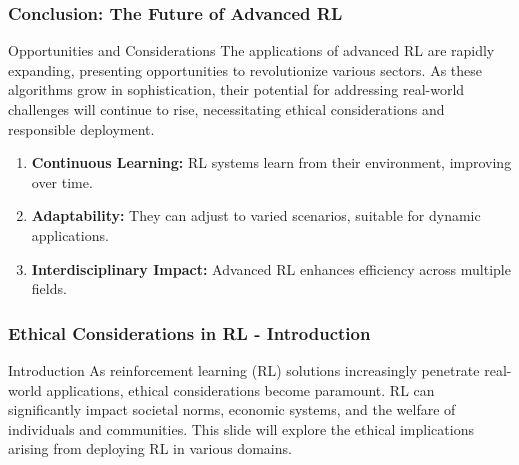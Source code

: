 \documentclass{beamer}
\begin{document}
\begin{frame}[fragile]
    \frametitle{Conclusion: The Future of Advanced RL}
    \begin{block}{Opportunities and Considerations}
        The applications of advanced RL are rapidly expanding, presenting opportunities to revolutionize various sectors. As these algorithms grow in sophistication, their potential for addressing real-world challenges will continue to rise, necessitating ethical considerations and responsible deployment.
    \end{block}

    \begin{enumerate}
        \item \textbf{Continuous Learning:} RL systems learn from their environment, improving over time.
        \item \textbf{Adaptability:} They can adjust to varied scenarios, suitable for dynamic applications.
        \item \textbf{Interdisciplinary Impact:} Advanced RL enhances efficiency across multiple fields.
    \end{enumerate}
\end{frame}

\begin{frame}[fragile]
    \frametitle{Ethical Considerations in RL - Introduction}
    \begin{block}{Introduction}
        As reinforcement learning (RL) solutions increasingly penetrate real-world applications, ethical considerations become paramount. 
        RL can significantly impact societal norms, economic systems, and the welfare of individuals and communities. 
        This slide will explore the ethical implications arising from deploying RL in various domains.
    \end{block}
\end{frame}
\end{document}

